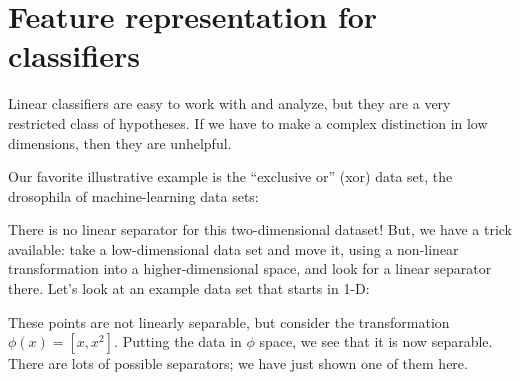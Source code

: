 \section{Feature representation for classifiers}

Linear classifiers are easy to work with and analyze, but they are a
very restricted class of hypotheses.  If we have to make a complex
distinction in low dimensions, then they are unhelpful.

Our favorite illustrative example is the ``exclusive or'' ({\sc xor})
data set, the drosophila 
of machine-learning data sets:

\begin{examplebox}
  \begin{center}
  \end{center}
\end{examplebox}

There is no linear separator for this two-dimensional dataset!  But, we have a trick
available:  take a low-dimensional data set and move it, using a
non-linear transformation into a higher-dimensional space, and look
for a linear separator there. Let's look at an example data set that
starts in 1-D:

\begin{examplebox}
  \begin{center}
  \end{center}
\end{examplebox}

These points are not linearly separable,   but consider the
transformation $\phi(x) = [x,x^2]$. Putting the data in $\phi$ space,
we see that it is now separable.  There are lots of possible
separators;  we have just shown one of them here.

